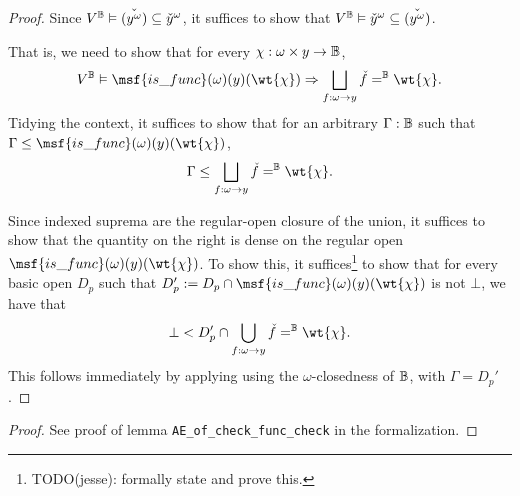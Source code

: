 \documentclass[11pt]{article}
\begin{document}
\begin{proof}
  Since $V^{\mathbb{B}} \vDash \check{(y^\omega)} \subseteq \check{y}^\omega$, it suffices to show that
  $V^{\mathbb{B}} \vDash \check{y}^\omega \subseteq \check{(y^\omega)}$.

  That is, we need to show that for every $\chi : \omega \times y \to \mathbb{B}$,
  $$
V^\B \vDash \msf{is\_func}(\omega) (y) (\wt{\chi}) \Rightarrow \bigsqcup_{f : \omega \to y} \check{f} =^\B \wt{\chi}.
$$
Tidying the context, it suffices to show that for an arbitrary $\Gamma : \mathbb{B}$ such that $\Gamma \leq \msf{is\_func}(\omega) (y) (\wt{\chi})$,
$$
\Gamma \leq \bigsqcup_{f : \omega \to y} \check{f} =^\B \wt{\chi}.
$$

Since indexed suprema are the regular-open closure of the union, it suffices to show that the quantity on the right is dense on the regular open $\msf{is\_func}(\omega) (y) (\wt{\chi})$. To show this, it suffices\footnote{TODO(jesse): formally state and prove this.} to show that for every basic open $D_p$ such that $D_p' := D_p \cap \msf{is\_func}(\omega) (y) (\wt{\chi})$ is not $\bot$, we have that
$$
\bot < D_p' \cap \bigcup_{f : \omega \to y} \check{f} =^\B \wt{\chi}.
$$
This follows immediately by applying  using the $\omega$-closedness of $\mathbb{B}$, with $\Gamma = D_p'$.


\end{proof}

\begin{proof}
  See proof of lemma \lstinline{AE_of_check_func_check} in the formalization.
\end{proof}
\end{document}
